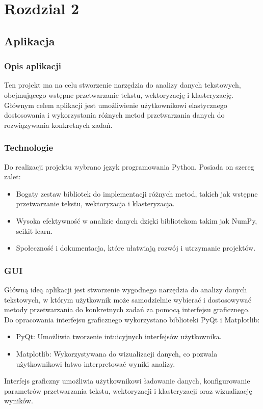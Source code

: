 \chapter{Rozdzial 2}
	
		
\section{Aplikacja}

	\subsection{Opis aplikacji}
		Ten projekt ma na celu stworzenie narzędzia do analizy danych tekstowych, obejmującego wstępne przetwarzanie tekstu, wektoryzację i klasteryzację. Głównym celem aplikacji jest umożliwienie użytkownikowi elastycznego dostosowania i wykorzystania różnych metod przetwarzania danych do rozwiązywania konkretnych zadań.
		
		
	\subsection{Technologie}
		Do realizacji projektu wybrano język programowania Python. Posiada on szereg zalet:
		\begin{itemize}
			\item Bogaty zestaw bibliotek do implementacji różnych metod, takich jak wstępne przetwarzanie tekstu, wektoryzacja i klasteryzacja.
			\item Wysoka efektywność w analizie danych dzięki bibliotekom takim jak NumPy, scikit-learn.
			\item Społeczność i dokumentacja, które ułatwiają rozwój i utrzymanie projektów.
		\end{itemize}
		
		
	\subsection{GUI}
		Główną ideą aplikacji jest stworzenie wygodnego narzędzia do analizy danych tekstowych, w którym użytkownik może samodzielnie wybierać i dostosowywać metody przetwarzania do konkretnych zadań za pomocą interfejsu graficznego. Do opracowania interfejsu graficznego wykorzystano biblioteki PyQt i Matplotlib:
		\begin{itemize}
			\item PyQt: Umożliwia tworzenie intuicyjnych interfejsów użytkownika.
			\item Matplotlib: Wykorzystywana do wizualizacji danych, co pozwala użytkownikowi łatwo interpretować wyniki analizy.
		\end{itemize}
		Interfejs graficzny umożliwia użytkownikowi ładowanie danych, konfigurowanie parametrów przetwarzania tekstu, wektoryzacji i klasteryzacji oraz wizualizację wyników.
		
